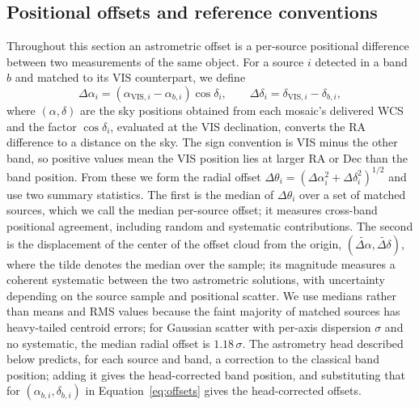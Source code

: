 \documentclass[twocolumn,linenumbers]{aastex701}
\begin{document}
\subsection{Positional offsets and reference conventions}

Throughout this section an astrometric offset is a per-source positional difference between two measurements of the same object. For a source $i$ detected in a band $b$ and matched to its VIS counterpart, we define
\begin{equation}
\Delta\alpha_i = \left(\alpha_{\mathrm{VIS},i} - \alpha_{b,i}\right)\cos\delta_i , \qquad
\Delta\delta_i = \delta_{\mathrm{VIS},i} - \delta_{b,i} ,
\label{eq:offsets}
\end{equation}
where $(\alpha,\delta)$ are the sky positions obtained from each mosaic's delivered WCS and the factor $\cos\delta_i$, evaluated at the VIS declination, converts the RA difference to a distance on the sky. The sign convention is VIS minus the other band, so positive values mean the VIS position lies at larger RA or Dec than the band position. From these we form the radial offset $\Delta\theta_i = (\Delta\alpha_i^2 + \Delta\delta_i^2)^{1/2}$ and use two summary statistics. The first is the median of $\Delta\theta_i$ over a set of matched sources, which we call the median per-source offset; it measures cross-band positional agreement, including random and systematic contributions. The second is the displacement of the center of the offset cloud from the origin, $(\widetilde{\Delta\alpha}, \widetilde{\Delta\delta})$, where the tilde denotes the median over the sample; its magnitude measures a coherent systematic between the two astrometric solutions, with uncertainty depending on the source sample and positional scatter. We use medians rather than means and RMS values because the faint majority of matched sources has heavy-tailed centroid errors; for Gaussian scatter with per-axis dispersion $\sigma$ and no systematic, the median radial offset is $1.18\,\sigma$. The astrometry head described below predicts, for each source and band, a correction to the classical band position; adding it gives the head-corrected band position, and substituting that for $(\alpha_{b,i},\delta_{b,i})$ in Equation~\ref{eq:offsets} gives the head-corrected offsets.
\end{document}
